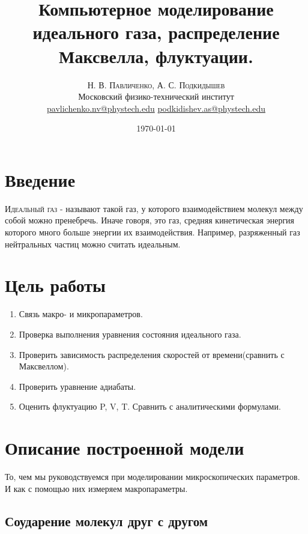 \documentclass[twoside,twocolumn, 11pt]{article}
\title{Компьютерное моделирование идеального газа, распределение Максвелла, флуктуации.} %
\author{%
\textsc{Н. В. Павличенко, А. С. Подкидышев} \\[1ex] %
\normalsize Московский физико-технический институт \\ %
\normalsize \href{mailto:pavlichenko.nv@phystech.edu}{pavlichenko.nv@phystech.edu}
\href{mailto:pavlichenko.nv@phystech.edu}{podkidishev.as@phystech.edu}%
}
\date{\today} %
\theoremstyle{plain}
\theoremstyle{definition}
\begin{document}
\maketitle

\section{Введение}

\lettrine[nindent=0em,lines=3]{И} {деальный газ} - называют такой газ, у которого взаимодействием молекул между собой можно пренебречь. Иначе говоря, это газ,
средняя кинетическая энергия которого много больше энергии их взаимодействия. Например, разряженный газ нейтральных частиц можно считать идеальным.

\section{Цель работы}
\begin{enumerate}
\item Связь макро- и микропараметров.
\item Проверка выполнения уравнения состояния идеального газа.
\item Проверить зависимость распределения скоростей от времени(сравнить с Максвеллом).
\item Проверить уравнение адиабаты.
\item Оценить флуктуацию P, V, T. Сравнить с аналитическими формулами.
\end{enumerate}

\section{Описание построенной модели}

\indent То, чем мы руководствуемся при моделировании микроскопических параметров. И как с помощью них измеряем макропараметры.

\subsection{Соударение молекул друг с другом}
\end{document}
